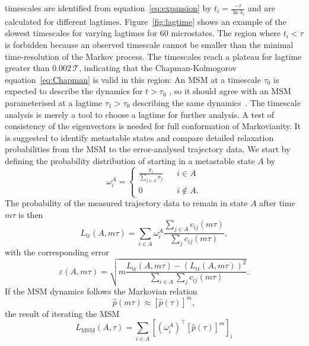 timescales are identified from equation~\ref{eq:expansion} by $t_i = \frac{-\tau}{\ln \lambda_i}$ and are calculated for different lagtimes. Figure~\ref{fig:lagtime} shows an example of the slowest timescales for varying lagtimes for 60 microstates. The region where $t_i < \tau$ is forbidden because an observed timescale cannot be smaller than the minimal time-resolution of the Markov process.
The timescales reach a plateau for lagtime greater than $ 0.002\,\mathcal{T}$, indicating that the Chapman-Kolmogorov equation~\ref{eq:Chapman} is valid in this region: An MSM at a timescale $\tau_0$ is expected to describe the dynamics for $t > \tau_0$ , so it should agree with
an MSM parameterised at a lagtime $\tau_1 > \tau_0$ describing the same dynamics~\cite{swope2004describing}.  The timescale analysis is merely a tool to choose a lagtime for further analysis.
A test of consistency of the eigenvectors is needed for full conformation of Markovianity.
It is suggested to identify metastable states and compare detailed relaxation probabilities from the MSM to the error-analysed trajectory data. We start by defining the probability distribution of starting in a metastable state $A$ by
\begin{equation}
 \omega^A_i = 
   \begin{cases}
    \frac{\pi_i}{\sum_{j \in A} \pi_j} &\;\;\; i \in A\\
     0 &\;\;\; i \notin A .
   \end{cases}
\end{equation}
The probability of the measured trajectory data to remain in state $A$ after time $m\tau$ is then
\begin{equation}
 L_{\text{tr}}(A,m\tau) = \sum_{i \in A} \omega_i^A \frac{\sum_{j \in A} c_{ij} (m\tau)}{\sum_j c_{ij} (m\tau)},
\end{equation}
with the corresponding error 
\begin{equation}
 \varepsilon(A,m\tau) = \sqrt{m\frac{L_{\text{tr}}(A,m\tau) - \left( L_{\text{tr} }(A,m\tau) \right )^2 }{ \sum_{i \in A} \sum_j c_{ij} (m\tau)} } .
\end{equation}
If the MSM dynamics follows the Markovian relation
\begin{equation}
 \hat p (m \tau) \approx \left [ \hat p(\tau) \right ]^m,
\end{equation}
the result of iterating the MSM 
\begin{equation}
 L_{\text{MSM}}(A,\tau) = \sum_{i \in A} \left [ (\omega_i^A)^\top  [\hat p(\tau)]^m \right ]_i 
\end{equation}
